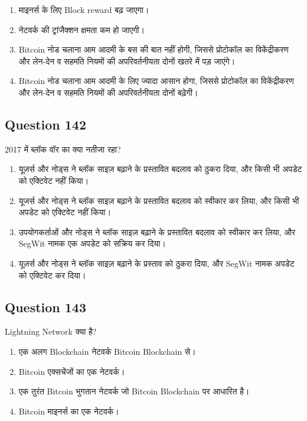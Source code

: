 \documentclass[12pt,a4paper]{article}
\begin{document}
\begin{enumerate}[label=\Alph*., leftmargin=*]
\item माइनर्स के लिए Block reward बढ़ जाएगा।
\item नेटवर्क की ट्रांजैक्शन क्षमता कम हो जाएगी।
\item Bitcoin नोड चलाना आम आदमी के बस की बात नहीं होगी, जिससे प्रोटोकॉल का विकेंद्रीकरण और लेन-देन व सहमति नियमों की अपरिवर्तनीयता दोनों खतरे में पड़ जाएंगे।
\item Bitcoin नोड चलाना आम आदमी के लिए ज्यादा आसान होगा, जिससे प्रोटोकॉल का विकेंद्रीकरण और लेन-देन व सहमति नियमों की अपरिवर्तनीयता दोनों बढ़ेगी।
\end{enumerate}

\bigskip


\subsection*{Question 142}
2017 में ब्लॉक वॉर का क्या नतीजा रहा?

\begin{enumerate}[label=\Alph*., leftmargin=*]
\item यूज़र्स और नोड्स ने ब्लॉक साइज़ बढ़ाने के प्रस्तावित बदलाव को ठुकरा दिया, और किसी भी अपडेट को एक्टिवेट नहीं किया।
\item यूजर्स और नोड्स ने ब्लॉक साइज़ बढ़ाने के प्रस्तावित बदलाव को स्वीकार कर लिया, और किसी भी अपडेट को एक्टिवेट नहीं किया।
\item उपयोगकर्ताओं और नोड्स ने ब्लॉक साइज़ बढ़ाने के प्रस्तावित बदलाव को स्वीकार कर लिया, और SegWit नामक एक अपडेट को सक्रिय कर दिया।
\item यूज़र्स और नोड्स ने ब्लॉक साइज़ बढ़ाने के प्रस्ताव को ठुकरा दिया, और SegWit नामक अपडेट को एक्टिवेट कर दिया।
\end{enumerate}

\bigskip


\subsection*{Question 143}
Lightning Network क्या है?

\begin{enumerate}[label=\Alph*., leftmargin=*]
\item एक अलग Blockchain नेटवर्क Bitcoin Blockchain से।
\item Bitcoin एक्सचेंजों का एक नेटवर्क।
\item एक तुरंत Bitcoin भुगतान नेटवर्क जो Bitcoin Blockchain पर आधारित है।
\item Bitcoin माइनर्स का एक नेटवर्क।
\end{enumerate}
\end{document}
